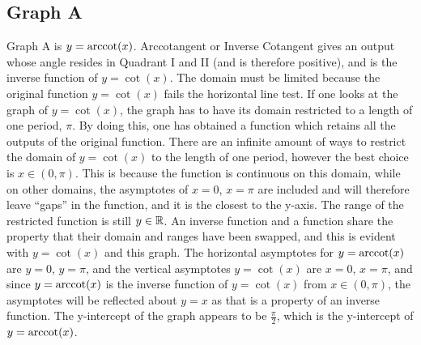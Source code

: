 \subsection{Graph A}

Graph A is $y=\operatorname{arccot}(x)$.
Arccotangent or Inverse Cotangent gives an output whose angle resides in Quadrant I and II (and is therefore positive), and is the inverse function of $y=\cot(x)$.
The domain must be limited because the original function $y=\cot(x)$ fails the horizontal line test.
If one looks at the graph of $y=\cot(x)$, the graph has to have its domain restricted to a length of one period, $\pi$.
By doing this, one has obtained a function which retains all the outputs of the original function.
There are an infinite amount of ways to restrict the domain of $y=\cot(x)$ to the length of one period, however the best choice is $x \in {(0,\pi)}$.
This is because the function is continuous on this domain, while on other domains, the asymptotes of $x=0$, $x=\pi$ are included and will therefore leave “gaps” in the function, and it is the closest to the y-axis.
The range of the restricted function is still $y \in \mathbb{R}$.
An inverse function and a function share the property that their domain and ranges have been swapped, and this is evident with $y=\cot(x)$ and this graph.
The horizontal asymptotes for $y=\operatorname{arccot}(x)$ are $y=0$, $y=\pi$, and the vertical asymptotes $y=\cot(x)$ are $x=0$, $x=\pi$, and since $y=\operatorname{arccot}(x)$ is the inverse function of $y=\cot(x)$ from $x \in {(0,\pi)}$, the asymptotes will be reflected about $y=x$ as that is a property of an inverse function.
The y-intercept of the graph appears to be $\frac{\pi}{2}$, which is the y-intercept of $y=\operatorname{arccot}(x)$.
